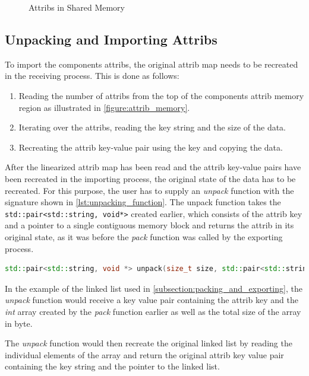 \begin{figure}[!ht]
    \centering
    \caption{Attribs in Shared Memory}
    \label{figure:attrib_memory}
\end{figure}

\subsection{Unpacking and Importing Attribs}
To import the components attribs, the original attrib map needs to be recreated in the receiving process. This is done as follows:

\begin{enumerate}
    \item Reading the number of attribs from the top of the components attrib memory region as illustrated in \autoref{figure:attrib_memory}.
    \item Iterating over the attribs, reading the key string and the size of the data.
    \item Recreating the attrib key-value pair using the key and copying the data.
\end{enumerate}

After the linearized attrib map has been read and the attrib key-value pairs have been recreated in the importing process, the original state of the data has to be recreated.
For this purpose, the user has to supply an \emph{unpack} function with the signature shown in \autoref{lst:unpacking_function}.
The unpack function takes the \lstinline|std::pair<std::string, void*>| created earlier, which consists of the attrib key and a pointer to a single contiguous memory block
and returns the attrib in its original state, as it was before the \emph{pack} function was called by the exporting process.

\begin{lstlisting}[language=c++, numbers=none, caption=Unpack Function Declaration, captionpos=b, breaklines=true, label={lst:unpacking_function}]
    std::pair<std::string, void *> unpack(size_t size, std::pair<std::string, void *> attrib);
\end{lstlisting}

In the example of the linked list used in \autoref{subsection:packing_and_exporting}, the \emph{unpack} function would receive a key value pair containing the attrib key
and the \emph{int} array created by the \emph{pack} function earlier as well as the total size of the array in byte.

The \emph{unpack} function would then recreate the original linked list by reading the individual elements of the array and return the original attrib key value pair containing
the key string and the pointer to the linked list.

